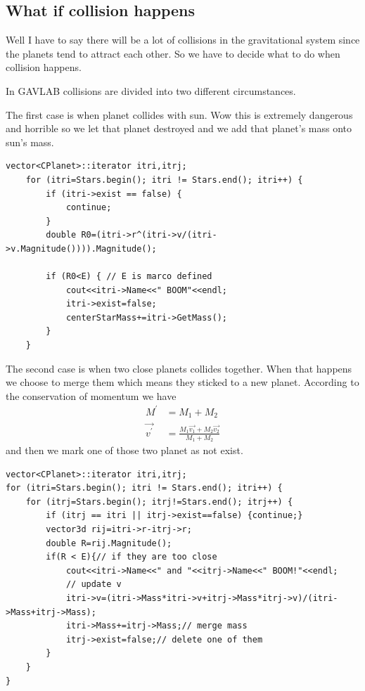 \documentclass[12pt]{article}
\begin{document}
\subsection{What if collision happens}
Well I have to say there will be a lot of collisions in the gravitational system
since the planets tend to attract each other.
So we have to decide what to do when collision happens.

In GAVLAB collisions are divided into two different circumstances.

The first case is when planet collides with sun.
Wow this is extremely dangerous and horrible so we let that planet destroyed and we add that
planet's mass onto sun's mass.
\begin{lstlisting}[caption=collision with sun]
    vector<CPlanet>::iterator itri,itrj;
    for (itri=Stars.begin(); itri != Stars.end(); itri++) {
        if (itri->exist == false) {
            continue;
        }
        double R0=(itri->r^(itri->v/(itri->v.Magnitude()))).Magnitude();
        
        if (R0<E) { // E is marco defined
            cout<<itri->Name<<" BOOM"<<endl;
            itri->exist=false;
            centerStarMass+=itri->GetMass();
        }
    }
\end{lstlisting}
\clearpage
The second case is when two close planets collides together.
When that happens we choose to merge them which means they sticked to a new planet.
According to the conservation of momentum we have
\begin{equation}
\begin{aligned}
M^\prime &= M_{1}+M_{2}\\
\vec{v^\prime} &= \frac{ M_{1}\vec{v_{1}} + M_{2}\vec{v_{2}}  }{M_{1}+M_{2}}
\end{aligned}
\end{equation}
and then we mark one of those two planet as not exist.
\begin{lstlisting}[caption=collision between planets]
vector<CPlanet>::iterator itri,itrj;
for (itri=Stars.begin(); itri != Stars.end(); itri++) {
	for (itrj=Stars.begin(); itrj!=Stars.end(); itrj++) {
        if (itrj == itri || itrj->exist==false) {continue;}
        vector3d rij=itri->r-itrj->r;
        double R=rij.Magnitude();
        if(R < E){// if they are too close
            cout<<itri->Name<<" and "<<itrj->Name<<" BOOM!"<<endl;
            // update v
            itri->v=(itri->Mass*itri->v+itrj->Mass*itrj->v)/(itri->Mass+itrj->Mass);
            itri->Mass+=itrj->Mass;// merge mass
            itrj->exist=false;// delete one of them
        }
    }
}
\end{lstlisting}
\end{document}
